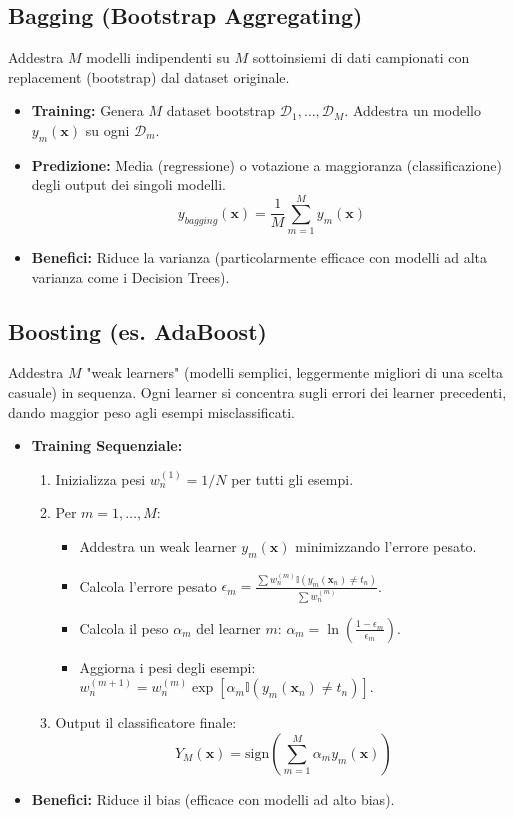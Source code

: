 \documentclass[a4paper,11pt]{article}
\begin{document}
\subsection{Bagging (Bootstrap Aggregating)}
Addestra $M$ modelli indipendenti su $M$ sottoinsiemi di dati campionati con replacement (bootstrap) dal dataset originale.
\begin{itemize}
    \item \textbf{Training:} Genera $M$ dataset bootstrap $\mathcal{D}_1, \dots, \mathcal{D}_M$. Addestra un modello $y_m(\mathbf{x})$ su ogni $\mathcal{D}_m$.
    \item \textbf{Predizione:} Media (regressione) o votazione a maggioranza (classificazione) degli output dei singoli modelli.
    \begin{equation}
        y_{bagging}(\mathbf{x}) = \frac{1}{M} \sum_{m=1}^M y_m(\mathbf{x})
    \end{equation}
    \item \textbf{Benefici:} Riduce la varianza (particolarmente efficace con modelli ad alta varianza come i Decision Trees).
\end{itemize}

\subsection{Boosting (es. AdaBoost)}
Addestra $M$ "weak learners" (modelli semplici, leggermente migliori di una scelta casuale) in sequenza. Ogni learner si concentra sugli errori dei learner precedenti, dando maggior peso agli esempi misclassificati.
\begin{itemize}
    \item \textbf{Training Sequenziale:}
    \begin{enumerate}
        \item Inizializza pesi $w_n^{(1)} = 1/N$ per tutti gli esempi.
        \item Per $m=1, \dots, M$:
        \begin{itemize}
            \item Addestra un weak learner $y_m(\mathbf{x})$ minimizzando l'errore pesato.
            \item Calcola l'errore pesato $\epsilon_m = \frac{\sum w_n^{(m)} \mathbb{I}(y_m(\mathbf{x}_n) \neq t_n)}{\sum w_n^{(m)}}$.
            \item Calcola il peso $\alpha_m$ del learner $m$: $\alpha_m = \ln \left( \frac{1 - \epsilon_m}{\epsilon_m} \right)$.
            \item Aggiorna i pesi degli esempi: $w_n^{(m+1)} = w_n^{(m)} \exp[ \alpha_m \mathbb{I}(y_m(\mathbf{x}_n) \neq t_n) ]$.
        \end{itemize}
        \item Output il classificatore finale:
        \begin{equation}
            Y_M(\mathbf{x}) = \text{sign} \left( \sum_{m=1}^M \alpha_m y_m(\mathbf{x}) \right)
        \end{equation}
    \end{enumerate}
    \item \textbf{Benefici:} Riduce il bias (efficace con modelli ad alto bias).
\end{itemize}
\end{document}
